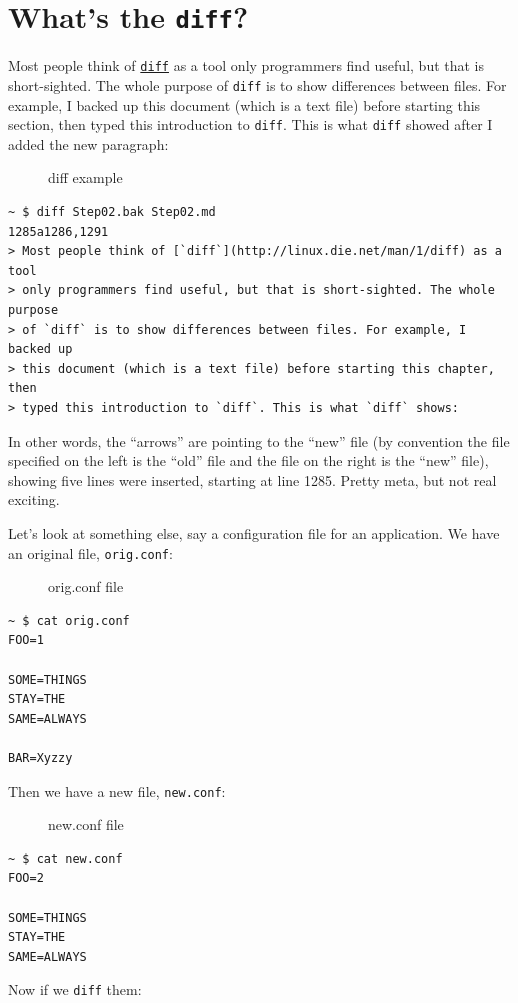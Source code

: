 \documentclass[10pt,]{book}
\numberwithin{figure}{chapter}
\DeclareRobustCommand{\drcap}[1]{\begin{figure}[H]\caption{#1}\end{figure}}
\DeclareRobustCommand{\drcmd}[1]{\index{Commands!#1}}
\begin{document}
\section{What's the \texttt{diff}?}\label{whats-the-diff}

Most people think of
\href{http://linux.die.net/man/1/diff}{\texttt{diff}}\drcmd{diff} as a
tool only programmers find useful, but that is short-sighted. The whole
purpose of \texttt{diff} is to show differences between files. For
example, I backed up this document (which is a text file) before
starting this section, then typed this introduction to \texttt{diff}.
This is what \texttt{diff} showed after I added the new paragraph:

\drcap{diff example}

\begin{verbatim}
~ $ diff Step02.bak Step02.md
1285a1286,1291
> Most people think of [`diff`](http://linux.die.net/man/1/diff) as a tool
> only programmers find useful, but that is short-sighted. The whole purpose
> of `diff` is to show differences between files. For example, I backed up
> this document (which is a text file) before starting this chapter, then
> typed this introduction to `diff`. This is what `diff` shows:
\end{verbatim}

In other words, the ``arrows'' are pointing to the ``new'' file (by
convention the file specified on the left is the ``old'' file and the
file on the right is the ``new'' file), showing five lines were
inserted, starting at line 1285. Pretty meta, but not real exciting.

Let's look at something else, say a configuration file for an
application. We have an original file, \texttt{orig.conf}:

\drcap{orig.conf file}

\begin{verbatim}
~ $ cat orig.conf
FOO=1

SOME=THINGS
STAY=THE
SAME=ALWAYS

BAR=Xyzzy
\end{verbatim}

Then we have a new file, \texttt{new.conf}:

\drcap{new.conf file}

\begin{verbatim}
~ $ cat new.conf
FOO=2

SOME=THINGS
STAY=THE
SAME=ALWAYS
\end{verbatim}

Now if we \texttt{diff} them:
\end{document}
